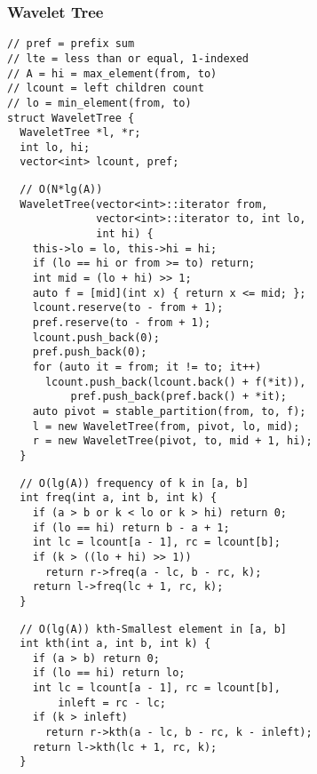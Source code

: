 \documentclass[twoside]{article}
\begin{document}
\begin{multicols*}{2}
\subsubsection*{Wavelet Tree}
\begin{verbatim}
// pref = prefix sum
// lte = less than or equal, 1-indexed
// A = hi = max_element(from, to)
// lcount = left children count
// lo = min_element(from, to)
struct WaveletTree {
  WaveletTree *l, *r;
  int lo, hi;
  vector<int> lcount, pref;
\end{verbatim}
\vspace{-12pt}
\begin{verbatim}
  // O(N*lg(A))
  WaveletTree(vector<int>::iterator from,
              vector<int>::iterator to, int lo,
              int hi) {
    this->lo = lo, this->hi = hi;
    if (lo == hi or from >= to) return;
    int mid = (lo + hi) >> 1;
    auto f = [mid](int x) { return x <= mid; };
    lcount.reserve(to - from + 1);
    pref.reserve(to - from + 1);
    lcount.push_back(0);
    pref.push_back(0);
    for (auto it = from; it != to; it++)
      lcount.push_back(lcount.back() + f(*it)),
          pref.push_back(pref.back() + *it);
    auto pivot = stable_partition(from, to, f);
    l = new WaveletTree(from, pivot, lo, mid);
    r = new WaveletTree(pivot, to, mid + 1, hi);
  }
\end{verbatim}
\vspace{-12pt}
\begin{verbatim}
  // O(lg(A)) frequency of k in [a, b]
  int freq(int a, int b, int k) {
    if (a > b or k < lo or k > hi) return 0;
    if (lo == hi) return b - a + 1;
    int lc = lcount[a - 1], rc = lcount[b];
    if (k > ((lo + hi) >> 1))
      return r->freq(a - lc, b - rc, k);
    return l->freq(lc + 1, rc, k);
  }
\end{verbatim}
\vspace{-12pt}
\begin{verbatim}
  // O(lg(A)) kth-Smallest element in [a, b]
  int kth(int a, int b, int k) {
    if (a > b) return 0;
    if (lo == hi) return lo;
    int lc = lcount[a - 1], rc = lcount[b],
        inleft = rc - lc;
    if (k > inleft)
      return r->kth(a - lc, b - rc, k - inleft);
    return l->kth(lc + 1, rc, k);
  }
\end{verbatim}
\vspace{-12pt}
\begin{verbatim}

\end{verbatim}
\end{multicols*}
\end{document}
